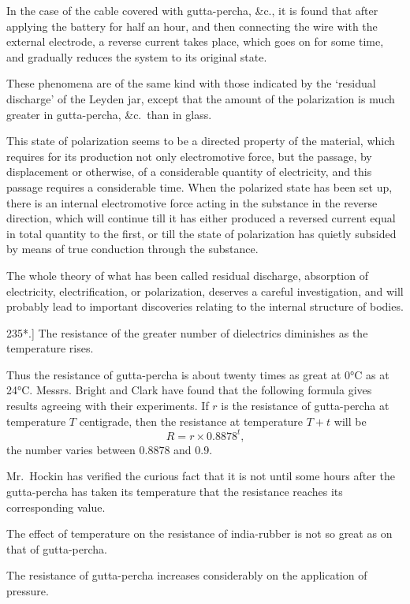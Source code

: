 \documentclass[12pt,oneside]{book}[2021/10/04]
\newcommand{\article}[1]{\phantomsection \label{art:#1}{#1.]}}
\newcommand{\¬}{\hphantom{0}}
\begin{document}
In the case of the cable covered with gutta-percha, \&c., it is
found that after applying the battery for half an hour, and then
connecting the wire with the external electrode, a reverse current
takes place, which goes on for some time, and gradually reduces
the system to its original state.

These phenomena are of the same kind with those indicated
by the `residual discharge' of the Leyden jar, except that the
amount of the polarization is much greater in gutta-percha, \&c.\
than in glass.

This state of polarization seems to be a directed property of the
material, which requires for its production not only electromotive
force, but the passage, by displacement or otherwise, of a considerable
quantity of electricity, and this passage requires a considerable
time. When the polarized state has been set up, there
is an internal electromotive force acting in the substance in the
reverse direction, which will continue till it has either produced
a reversed current equal in total quantity to the first, or till the
state of polarization has quietly subsided by means of true conduction
through the substance.

The whole theory of what has been called residual discharge,
absorption of electricity, electrification, or polarization, deserves
a careful investigation, and will probably lead to important discoveries
relating to the internal structure of bodies.

\article{235*} The resistance of the greater number of dielectrics diminishes
as the temperature rises.

Thus the resistance of gutta-percha is about twenty times as great
at 0°C as at 24°C. Messrs. Bright and Clark have found that the
following formula gives results agreeing with their experiments.
If \(r\) is the resistance of gutta-percha at temperature \(T\) centigrade,
then the resistance at temperature \(T + t\) will be
\[
R = r \times 0.8878^t\text{,}
\]
the number varies between 0.8878 and 0.9.

Mr.\ Hockin has verified the curious fact that it is not until some
hours after the gutta-percha has taken its temperature that the
resistance reaches its corresponding value.

The effect of temperature on the resistance of india-rubber is not
so great as on that of gutta-percha.

The resistance of gutta-percha increases considerably on the application
of pressure.
\end{document}
